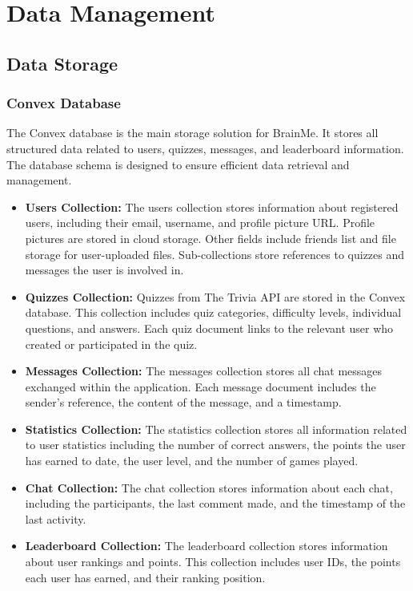 \section{Data Management}

\subsection{Data Storage}

\subsubsection{Convex Database}

The Convex database is the main storage solution for BrainMe. It stores all structured data related to users, quizzes, messages, and leaderboard information. The database schema is designed to ensure efficient data retrieval and management.

\begin{itemize}
  \item \textbf{Users Collection:} The users collection stores information about registered users, including their email, username, and profile picture URL. Profile pictures are stored in cloud storage. Other fields include friends list and file storage for user-uploaded files. Sub-collections store references to quizzes and messages the user is involved in.
  \item \textbf{Quizzes Collection:} Quizzes from The Trivia API are stored in the Convex database. This collection includes quiz categories, difficulty levels, individual questions, and answers. Each quiz document links to the relevant user who created or participated in the quiz.
  \item \textbf{Messages Collection:} The messages collection stores all chat messages exchanged within the application. Each message document includes the sender's reference, the content of the message, and a timestamp.
  \item \textbf{Statistics Collection:} The statistics collection stores all information related to user statistics including the number of correct answers, the points the user has earned to date, the user level, and the number of games played.
  \item \textbf{Chat Collection:} The chat collection stores information about each chat, including the participants, the last comment made, and the timestamp of the last activity.
  \item \textbf{Leaderboard Collection:} The leaderboard collection stores information about user rankings and points. This collection includes user IDs, the points each user has earned, and their ranking position.
\end{itemize}

